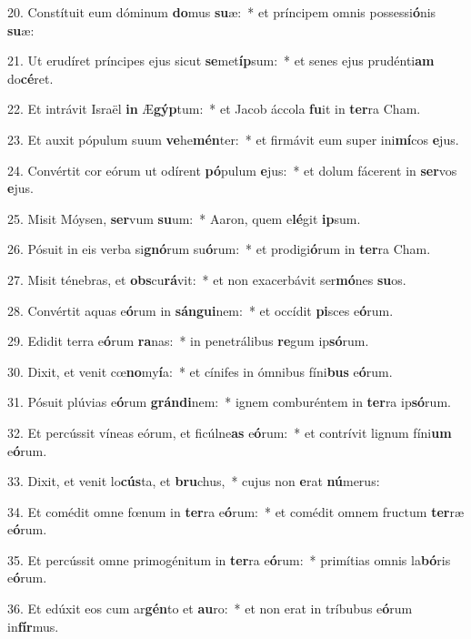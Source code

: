 20. Constítuit eum dóminum \textbf{do}mus \textbf{su}æ:~*  et príncipem omnis possessi\textbf{ó}nis \textbf{su}æ:\

21. Ut erudíret príncipes ejus sicut \textbf{se}met\textbf{íp}sum:~*  et senes ejus prudénti\textbf{am} do\textbf{cé}ret.\

22. Et intrávit Israël \textbf{in} Æ\textbf{gýp}tum:~*  et Jacob áccola \textbf{fu}it in \textbf{ter}ra Cham.\

23. Et auxit pópulum suum \textbf{ve}he\textbf{mén}ter:~*  et firmávit eum super ini\textbf{mí}cos \textbf{e}jus.\

24. Convértit cor eórum ut odírent \textbf{pó}pulum \textbf{e}jus:~*  et dolum fácerent in \textbf{ser}vos \textbf{e}jus.\

25. Misit Móysen, \textbf{ser}vum \textbf{su}um:~*  Aaron, quem e\textbf{lé}git \textbf{ip}sum.\

26. Pósuit in eis verba si\textbf{gnó}rum su\textbf{ó}rum:~*  et prodigi\textbf{ó}rum in \textbf{ter}ra Cham.\

27. Misit ténebras, et \textbf{obs}cu\textbf{rá}vit:~*  et non exacerbávit ser\textbf{mó}nes \textbf{su}os.\

28. Convértit aquas e\textbf{ó}rum in \textbf{sán}\textbf{gui}nem:~*  et occídit \textbf{pi}sces e\textbf{ó}rum.\

29. Edidit terra e\textbf{ó}rum \textbf{ra}nas:~*  in penetrálibus \textbf{re}gum ip\textbf{só}rum.\

30. Dixit, et venit cœ\textbf{no}my\textbf{í}a:~*  et cínifes in ómnibus fíni\textbf{bus} e\textbf{ó}rum.\

31. Pósuit plúvias e\textbf{ó}rum \textbf{grán}\textbf{di}nem:~*  ignem comburéntem in \textbf{ter}ra ip\textbf{só}rum.\

32. Et percússit víneas eórum, et ficúlne\textbf{as} e\textbf{ó}rum:~*  et contrívit lignum fíni\textbf{um} e\textbf{ó}rum.\

33. Dixit, et venit lo\textbf{cús}ta, et \textbf{bru}chus,~*  cujus non \textbf{e}rat \textbf{nú}merus:\

34. Et comédit omne fœnum in \textbf{ter}ra e\textbf{ó}rum:~*  et comédit omnem fructum \textbf{ter}ræ e\textbf{ó}rum.\

35. Et percússit omne primogénitum in \textbf{ter}ra e\textbf{ó}rum:~*  primítias omnis la\textbf{bó}ris e\textbf{ó}rum.\

36. Et edúxit eos cum ar\textbf{gén}to et \textbf{au}ro:~*  et non erat in tríbubus e\textbf{ó}rum in\textbf{fír}mus.\

